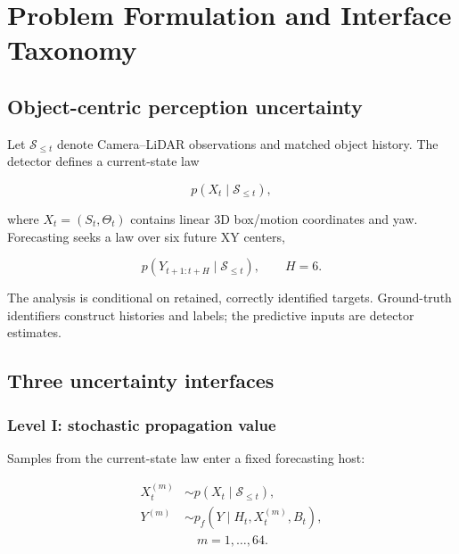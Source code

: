 \documentclass[lettersize,journal]{IEEEtran}
\begin{document}
\section{Problem Formulation and Interface Taxonomy}
\label{sec:section3}

\subsection{Object-centric perception uncertainty}
\label{subsec:section3-1}

Let \(\mathcal{S}_{\le t}\) denote Camera--LiDAR observations and matched object history. The detector defines a current-state law

\begin{equation}
\label{eq:current-state-law}
p(X_t\mid\mathcal{S}_{\le t}),
\end{equation}

where \(X_t=(S_t,\Theta_t)\) contains linear 3D box/motion coordinates and yaw. Forecasting seeks a law over six future XY centers,

\begin{equation}
\label{eq:future-trajectory-law}
p(Y_{t+1:t+H}\mid\mathcal{S}_{\le t}),\qquad H=6.
\end{equation}

The analysis is conditional on retained, correctly identified targets. Ground-truth identifiers construct histories and labels; the predictive inputs are detector estimates.

\subsection{Three uncertainty interfaces}
\label{subsec:section3-2}

\subsubsection{Level I: stochastic propagation value}
\label{subsubsec:section3-2-1}

Samples from the current-state law enter a fixed forecasting host:

\begin{equation}
\label{eq:stochastic-propagation}
\begin{aligned}
X_t^{(m)}&\sim p(X_t\mid\mathcal{S}_{\le t}), \\[-1pt]
Y^{(m)}&\sim p_f(Y\mid H_t,X_t^{(m)},B_t), \\[-1pt]
&\quad m=1,\ldots,64.
\end{aligned}
\end{equation}
\end{document}
